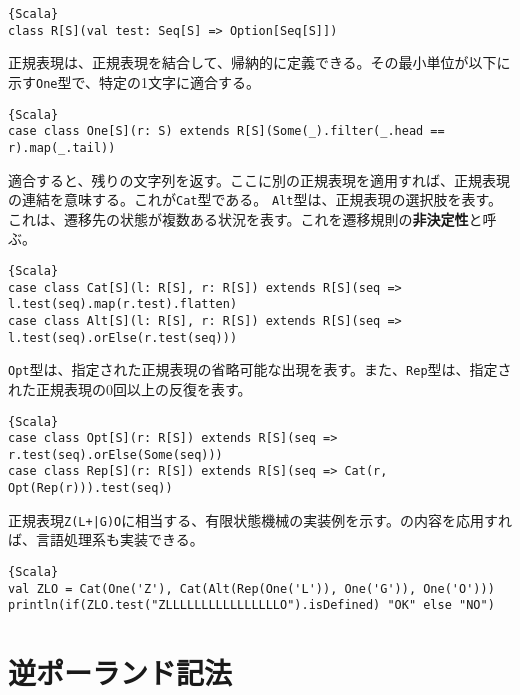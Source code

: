 \documentclass[10pt,a4paper]{book}
\begin{document}
\begin{Verbatim}{Scala}
class R[S](val test: Seq[S] => Option[Seq[S]])
\end{Verbatim}

正規表現は、正規表現を結合して、帰納的に定義できる。その最小単位が以下に示す\texttt{One}型で、特定の1文字に適合する。

\begin{Verbatim}{Scala}
case class One[S](r: S) extends R[S](Some(_).filter(_.head == r).map(_.tail))
\end{Verbatim}

適合すると、残りの文字列を返す。ここに別の正規表現を適用すれば、正規表現の連結を意味する。これが\texttt{Cat}型である。
\texttt{Alt}型は、正規表現の選択肢を表す。これは、遷移先の状態が複数ある状況を表す。これを遷移規則の\textbf{非決定性}と呼ぶ。

\begin{Verbatim}{Scala}
case class Cat[S](l: R[S], r: R[S]) extends R[S](seq => l.test(seq).map(r.test).flatten)
case class Alt[S](l: R[S], r: R[S]) extends R[S](seq => l.test(seq).orElse(r.test(seq)))
\end{Verbatim}

\texttt{Opt}型は、指定された正規表現の省略可能な出現を表す。また、\texttt{Rep}型は、指定された正規表現の0回以上の反復を表す。

\begin{Verbatim}{Scala}
case class Opt[S](r: R[S]) extends R[S](seq => r.test(seq).orElse(Some(seq)))
case class Rep[S](r: R[S]) extends R[S](seq => Cat(r, Opt(Rep(r))).test(seq))
\end{Verbatim}

正規表現\texttt{Z(L+|G)O}に相当する、有限状態機械の実装例を示す。の内容を応用すれば、言語処理系も実装できる。

\begin{Verbatim}{Scala}
val ZLO = Cat(One('Z'), Cat(Alt(Rep(One('L')), One('G')), One('O')))
println(if(ZLO.test("ZLLLLLLLLLLLLLLLLO").isDefined) "OK" else "NO")
\end{Verbatim}

\section{逆ポーランド記法\label{sect:pola}}
\end{document}
